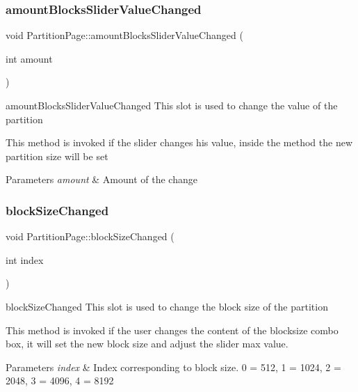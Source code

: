 \subsubsection{\texorpdfstring{amount\+Blocks\+Slider\+Value\+Changed}{amountBlocksSliderValueChanged}}
{\footnotesize\ttfamily void Partition\+Page\+::amount\+Blocks\+Slider\+Value\+Changed (\begin{DoxyParamCaption}\item[{int}]{amount }\end{DoxyParamCaption})\hspace{0.3cm}{\ttfamily [slot]}}



amount\+Blocks\+Slider\+Value\+Changed This slot is used to change the value of the partition 

This method is invoked if the slider changes his value, inside the method the new partition size will be set 
\begin{DoxyParams}{Parameters}
{\em amount} & Amount of the change \\
\hline
\end{DoxyParams}
\mbox{\label{classui_1_1wizard_1_1pages_1_1_partition_page_aa90723be1956b54ce182cc64b3b4ce6f}} 
\subsubsection{\texorpdfstring{block\+Size\+Changed}{blockSizeChanged}}
{\footnotesize\ttfamily void Partition\+Page\+::block\+Size\+Changed (\begin{DoxyParamCaption}\item[{int}]{index }\end{DoxyParamCaption})\hspace{0.3cm}{\ttfamily [slot]}}



block\+Size\+Changed This slot is used to change the block size of the partition 

This method is invoked if the user changes the content of the blocksize combo box, it will set the new block size and adjust the slider max value. 
\begin{DoxyParams}{Parameters}
{\em index} & Index corresponding to block size. 0 = 512, 1 = 1024, 2 = 2048, 3 = 4096, 4 = 8192 \\
\hline
\end{DoxyParams}
\mbox{\label{classui_1_1wizard_1_1pages_1_1_partition_page_a63ae270155bc6d01ae83adf63860d6f9}} 
